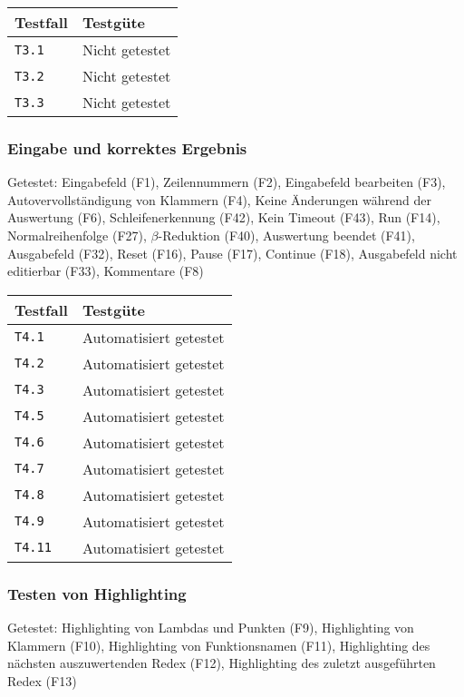 \documentclass[parskip=full,11pt,twoside]{scrartcl}
\newcommand{\testline}[2]{
    \texttt{#1} & 
    \ifthenelse{\equal{#2}{Nicht getestet}}
        {\cellcolor{red!20}}
        {}
    \ifthenelse{\equal{#2}{Manuell getestet}}
        {\cellcolor{LimeGreen!20}}
        {}
    \ifthenelse{\equal{#2}{Automatisiert getestet}}
        {\cellcolor{green!20}}
        {}
    #2 \\ \hline
}
\begin{document}
    \label{shortcuts}
    \begin{center}
        \begin{tabular}{ p{9cm} p{4cm}}
            Testfall & Testgüte \\ \hline
            \testline{T3.1}{Nicht getestet}
            \testline{T3.2}{Nicht getestet}
            \testline{T3.3}{Nicht getestet}
        \end{tabular}
    \end{center}

\subsubsection{Eingabe und korrektes Ergebnis}
    Getestet:
    Eingabefeld (F1),
    Zeilennummern (F2),
    Eingabefeld bearbeiten (F3),
    Autovervollständigung von Klammern (F4),
    Keine Änderungen während der Auswertung (F6),
    Schleifenerkennung (F42),
    Kein Timeout (F43),
    Run (F14),
    Normalreihenfolge (F27),
    $\beta$-Reduktion (F40),
    Auswertung beendet (F41),
    Ausgabefeld (F32),
    Reset (F16),
    Pause (F17),
    Continue (F18),
    Ausgabefeld nicht editierbar (F33),
    Kommentare (F8)

    \label{shortcuts}
    \begin{center}
        \begin{tabular}{ p{9cm} p{4cm}}
            Testfall & Testgüte \\ \hline
            \testline{T4.1}{Automatisiert getestet}
            \testline{T4.2}{Automatisiert getestet}
            \testline{T4.3}{Automatisiert getestet}
            \testline{T4.5}{Automatisiert getestet}
            \testline{T4.6}{Automatisiert getestet}
            \testline{T4.7}{Automatisiert getestet}
            \testline{T4.8}{Automatisiert getestet}
            \testline{T4.9}{Automatisiert getestet}
            \testline{T4.11}{Automatisiert getestet}
        \end{tabular}
    \end{center}

\subsubsection{Testen von Highlighting}
    Getestet:
    Highlighting von Lambdas und Punkten (F9),
    Highlighting von Klammern (F10),
    Highlighting von Funktionsnamen (F11),
    Highlighting des nächsten auszuwertenden Redex (F12),
    Highlighting des zuletzt ausgeführten Redex (F13)
\end{document}
